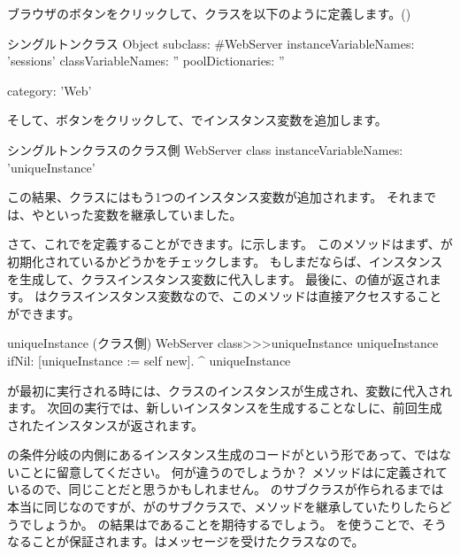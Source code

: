 \documentclass[a4paper,10pt,twoside]{book}
\begin{document}
ブラウザのボタンをクリックして、クラスを以下のように定義します。()

\begin{classdef}[singleton]{シングルトンクラス}
Object subclass: #WebServer
	instanceVariableNames: 'sessions' 	
	classVariableNames: '' 	
	poolDictionaries: '' 	

	category: 'Web'
\end{classdef}

そして、ボタンをクリックして、でインスタンス変数を追加します。

\begin{classdef}[webserver]{シングルトンクラスのクラス側}
WebServer class 	
	instanceVariableNames: 'uniqueInstance'
\end{classdef}

この結果、クラスにはもう1つのインスタンス変数が追加されます。
それまでは、やといった変数を継承していました。

さて、これでを定義することができます。に示します。
このメソッドはまず、が初期化されているかどうかをチェックします。
もしまだならば、インスタンスを生成して、クラスインスタンス変数に代入します。
最後に、の値が返されます。
はクラスインスタンス変数なので、このメソッドは直接アクセスすることができます。
    
\begin{method}[uniqueInstance]{uniqueInstance (クラス側)}
WebServer class>>>uniqueInstance
     uniqueInstance ifNil: [uniqueInstance := self new].
     ^ uniqueInstance
\end{method}

が最初に実行される時には、クラスのインスタンスが生成され、変数に代入されます。
次回の実行では、新しいインスタンスを生成することなしに、前回生成されたインスタンスが返されます。

の条件分岐の内側にあるインスタンス生成のコードがという形であって、ではないことに留意してください。
何が違うのでしょうか？
メソッドはに定義されているので、同じことだと思うかもしれません。
のサブクラスが作られるまでは本当に同じなのですが、がのサブクラスで、メソッドを継承していたりしたらどうでしょうか。
の結果はであることを期待するでしょう。
\self を使うことで、そうなることが保証されます。\self はメッセージを受けたクラスなので。
\end{document}
